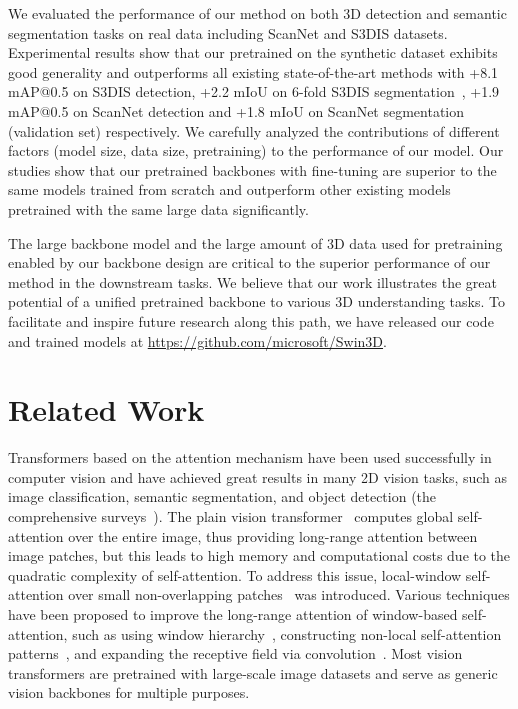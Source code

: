 \documentclass[10pt,twocolumn,letterpaper]{article}
\begin{document}
    We evaluated the performance of our method on both 3D detection and semantic segmentation tasks on real data including ScanNet and S3DIS datasets. Experimental results show that our {\SST} pretrained on the synthetic dataset exhibits good generality and outperforms all existing state-of-the-art methods with +8.1 mAP@0.5 on S3DIS detection, +2.2 mIoU on 6-fold S3DIS segmentation~\cite{S3DIS}, +1.9 mAP@0.5 on ScanNet detection and +1.8 mIoU on ScanNet segmentation (validation set) respectively. We carefully analyzed the contributions of different factors (\eg model size, data size, pretraining) to the performance of our model. Our studies show that our pretrained backbones with fine-tuning are superior to the same models trained from scratch and outperform other existing models pretrained with the same large data significantly.

The large backbone model and the large amount of 3D data used for pretraining enabled by our backbone design are critical to the superior performance of our method in the downstream tasks. We believe that our work illustrates the great potential of a unified pretrained backbone to various 3D understanding tasks. To facilitate and inspire future research along this path, we have released our code and trained models at \url{https://github.com/microsoft/Swin3D}.

\section{Related Work}

 Transformers based on the attention mechanism have been used successfully in computer vision and have achieved great results in many 2D vision tasks, such as image classification, semantic segmentation, and object detection (\cf the comprehensive surveys~\cite{khan2021transformers,han2022survey,guo2022attention}). The plain vision transformer~\cite{dosovitskiy2020image} computes global self-attention over the entire image, thus providing long-range attention between image patches, but this leads to high memory and computational costs due to the quadratic complexity of self-attention. To address this issue, local-window self-attention over small non-overlapping patches~\cite{han2021demystifying,liu2021swin} was introduced. Various techniques have been proposed to improve the long-range attention of window-based self-attention, such as using window hierarchy~\cite{liu2021swin}, constructing non-local self-attention patterns~\cite{dong2022cswin,tu2022maxvit,zhang2022vsa,wu2022pale,yang2021focal,li2022sepvit,wang2021crossformer,chu2021twins}, and expanding the receptive field via convolution~\cite{chen2022mixformer,yuan2021hrformer}. Most vision transformers are pretrained with large-scale image datasets and serve as generic vision backbones for multiple purposes.
\end{document}
